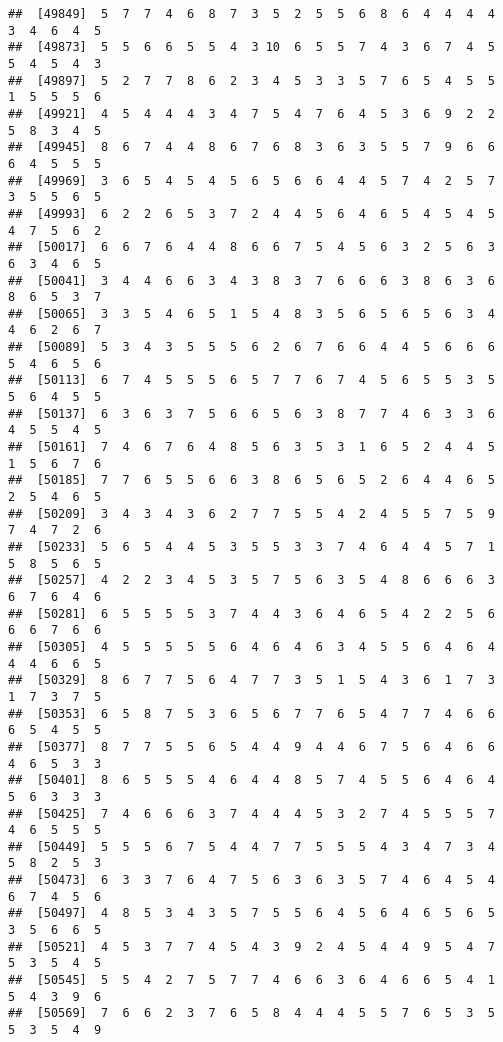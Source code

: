 \documentclass[
]{book}
\begin{document}
\begin{verbatim}
##  [49849]  5  7  7  4  6  8  7  3  5  2  5  5  6  8  6  4  4  4  4  3  4  6  4  5
##  [49873]  5  5  6  6  5  5  4  3 10  6  5  5  7  4  3  6  7  4  5  5  4  5  4  3
##  [49897]  5  2  7  7  8  6  2  3  4  5  3  3  5  7  6  5  4  5  5  1  5  5  5  6
##  [49921]  4  5  4  4  4  3  4  7  5  4  7  6  4  5  3  6  9  2  2  5  8  3  4  5
##  [49945]  8  6  7  4  4  8  6  7  6  8  3  6  3  5  5  7  9  6  6  6  4  5  5  5
##  [49969]  3  6  5  4  5  4  5  6  5  6  6  4  4  5  7  4  2  5  7  3  5  5  6  5
##  [49993]  6  2  2  6  5  3  7  2  4  4  5  6  4  6  5  4  5  4  5  4  7  5  6  2
##  [50017]  6  6  7  6  4  4  8  6  6  7  5  4  5  6  3  2  5  6  3  6  3  4  6  5
##  [50041]  3  4  4  6  6  3  4  3  8  3  7  6  6  6  3  8  6  3  6  8  6  5  3  7
##  [50065]  3  3  5  4  6  5  1  5  4  8  3  5  6  5  6  5  6  3  4  4  6  2  6  7
##  [50089]  5  3  4  3  5  5  5  6  2  6  7  6  6  4  4  5  6  6  6  5  4  6  5  6
##  [50113]  6  7  4  5  5  5  6  5  7  7  6  7  4  5  6  5  5  3  5  5  6  4  5  5
##  [50137]  6  3  6  3  7  5  6  6  5  6  3  8  7  7  4  6  3  3  6  4  5  5  4  5
##  [50161]  7  4  6  7  6  4  8  5  6  3  5  3  1  6  5  2  4  4  5  1  5  6  7  6
##  [50185]  7  7  6  5  5  6  6  3  8  6  5  6  5  2  6  4  4  6  5  2  5  4  6  5
##  [50209]  3  4  3  4  3  6  2  7  7  5  5  4  2  4  5  5  7  5  9  7  4  7  2  6
##  [50233]  5  6  5  4  4  5  3  5  5  3  3  7  4  6  4  4  5  7  1  5  8  5  6  5
##  [50257]  4  2  2  3  4  5  3  5  7  5  6  3  5  4  8  6  6  6  3  6  7  6  4  6
##  [50281]  6  5  5  5  5  3  7  4  4  3  6  4  6  5  4  2  2  5  6  6  6  7  6  6
##  [50305]  4  5  5  5  5  5  6  4  6  4  6  3  4  5  5  6  4  6  4  4  4  6  6  5
##  [50329]  8  6  7  7  5  6  4  7  7  3  5  1  5  4  3  6  1  7  3  1  7  3  7  5
##  [50353]  6  5  8  7  5  3  6  5  6  7  7  6  5  4  7  7  4  6  6  6  5  4  5  5
##  [50377]  8  7  7  5  5  6  5  4  4  9  4  4  6  7  5  6  4  6  6  4  6  5  3  3
##  [50401]  8  6  5  5  5  4  6  4  4  8  5  7  4  5  5  6  4  6  4  5  6  3  3  3
##  [50425]  7  4  6  6  6  3  7  4  4  4  5  3  2  7  4  5  5  5  7  4  6  5  5  5
##  [50449]  5  5  5  6  7  5  4  4  7  7  5  5  5  4  3  4  7  3  4  5  8  2  5  3
##  [50473]  6  3  3  7  6  4  7  5  6  3  6  3  5  7  4  6  4  5  4  6  7  4  5  6
##  [50497]  4  8  5  3  4  3  5  7  5  5  6  4  5  6  4  6  5  6  5  3  5  6  6  5
##  [50521]  4  5  3  7  7  4  5  4  3  9  2  4  5  4  4  9  5  4  7  5  3  5  4  5
##  [50545]  5  5  4  2  7  5  7  7  4  6  6  3  6  4  6  6  5  4  1  5  4  3  9  6
##  [50569]  7  6  6  2  3  7  6  5  8  4  4  4  5  5  7  6  5  3  5  5  3  5  4  9

\end{verbatim}
\end{document}
